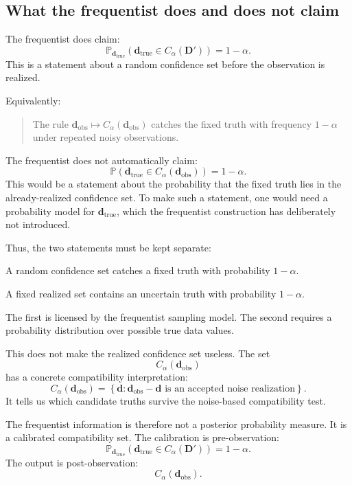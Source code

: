 \documentclass[11pt]{article}
\newcommand{\Dobsrand}{\mathbf D'}
\newcommand{\dtrue}{\mathbf d_{\mathrm{true}}}
\newcommand{\dobs}{\mathbf d_{\mathrm{obs}}}
\newcommand{\Calpha}{C_{\alpha}}
\newcommand{\Prob}{\mathbb P}
\begin{document}
\subsection{What the frequentist does and does not claim}

The frequentist does claim:
\[
    \Prob_{\dtrue}
    \left(
        \dtrue\in\Calpha(\Dobsrand)
    \right)
    =
    1-\alpha.
\]
This is a statement about a random confidence set before the observation is realized.

Equivalently:
\begin{quote}
    The rule \(\dobs\mapsto\Calpha(\dobs)\) catches the fixed truth with frequency \(1-\alpha\) under repeated noisy observations.
\end{quote}

The frequentist does not automatically claim:
\[
    \Prob
    \left(
        \dtrue\in\Calpha(\dobs)
    \right)
    =
    1-\alpha.
\]
This would be a statement about the probability that the fixed truth lies in the already-realized confidence set. To make such a statement, one would need a probability model for \(\dtrue\), which the frequentist construction has deliberately not introduced.

Thus, the two statements must be kept separate:
\begin{description}[leftmargin=3.7cm,style=nextline]
    \item[Frequentist coverage.]
    A random confidence set catches a fixed truth with probability \(1-\alpha\).

    \item[Posterior-style statement.]
    A fixed realized set contains an uncertain truth with probability \(1-\alpha\).
\end{description}

The first is licensed by the frequentist sampling model. The second requires a probability distribution over possible true data values.

This does not make the realized confidence set useless. The set
\[
    \Calpha(\dobs)
\]
has a concrete compatibility interpretation:
\[
    \Calpha(\dobs)
    =
    \left\{
        \mathbf d:
        \dobs-\mathbf d
        \text{ is an accepted noise realization}
    \right\}.
\]
It tells us which candidate truths survive the noise-based compatibility test.

The frequentist information is therefore not a posterior probability measure. It is a calibrated compatibility set. The calibration is pre-observation:
\[
    \Prob_{\dtrue}
    \left(
        \dtrue\in\Calpha(\Dobsrand)
    \right)
    =
    1-\alpha.
\]
The output is post-observation:
\[
    \Calpha(\dobs).
\]
\end{document}
